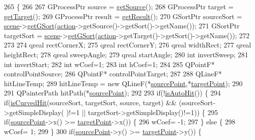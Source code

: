 \begin{DoxyCode}
265                                     \{
266 
267     GProcessPtr source = \hyperlink{classGAction_a4f4c104269fd0d40a61b22458db42dee}{getSource}();
268     GProcessPtr target = \hyperlink{classGAction_ac7aff6bc03be3791a8a20a914aae5b2c}{getTarget}();
269     GProcessPtr result = \hyperlink{classGAction_ae1ed003118c8333c6afa2e8d30e3dc07}{getResult}();
270     GSortPtr sourceSort = \hyperlink{classGAction_a5318deb6935859f5d2ebd1836ec6eb85}{scene}->\hyperlink{classPHScene_ae8be020b063c06f135d644937d65147b}{getGSort}(\hyperlink{classGAction_a22f734f6fb2fade298681819341b4f75}{action}->getSource()->getSort()->getName());
271     GSortPtr targetSort = \hyperlink{classGAction_a5318deb6935859f5d2ebd1836ec6eb85}{scene}->\hyperlink{classPHScene_ae8be020b063c06f135d644937d65147b}{getGSort}(\hyperlink{classGAction_a22f734f6fb2fade298681819341b4f75}{action}->getTarget()->getSort()->getName());
272 
273 
274     qreal rectCornerX;
275     qreal rectCornerY;
276     qreal widthRect;
277     qreal heightRect;
278     qreal sweepAngle;
279     qreal startAngle;
280     \textcolor{keywordtype}{int} invertSweep;
281     \textcolor{keywordtype}{int} invertStart;
282     \textcolor{keywordtype}{int} wCoef=1;
283     \textcolor{keywordtype}{int} hCoef=1;
284 
285     QPointF* controlPointSource;
286     QPointF* controlPointTarget;
287 
288     QLineF* hitLineTemp;
289     hitLineTemp = \textcolor{keyword}{new} QLineF(*\hyperlink{classGAction_adf67bcd561238d7626566cebeee2a151}{sourcePoint},*\hyperlink{classGAction_ad6992ac8b540932c370f5b46c48bbe70}{targetPoint});
290 
291     QPainterPath hitPath(*\hyperlink{classGAction_adf67bcd561238d7626566cebeee2a151}{sourcePoint});
292 
293     \textcolor{keywordflow}{if}(!\hyperlink{classGAction_aa03acf91fcd0c6b8eaa4fb5e610e83e5}{isAutoHit}()) \{
294         \textcolor{keywordflow}{if}(\hyperlink{classGAction_a92cac7175b3969a54197d401c13f5273}{isCurvedHit}(sourceSort, targetSort, source, target) && (sourceSort->getSimpleDisplay(
      )!=1 || targetSort->getSimpleDisplay()!=1)) \{
295             \textcolor{keywordflow}{if}(\hyperlink{classGAction_adf67bcd561238d7626566cebeee2a151}{sourcePoint}->x() >= \hyperlink{classGAction_ad6992ac8b540932c370f5b46c48bbe70}{targetPoint}->x()) \{
296                 wCoef= -1;
297             \} \textcolor{keywordflow}{else} \{
298                 wCoef= 1;
299             \}
300             \textcolor{keywordflow}{if}(\hyperlink{classGAction_adf67bcd561238d7626566cebeee2a151}{sourcePoint}->y() >= \hyperlink{classGAction_ad6992ac8b540932c370f5b46c48bbe70}{targetPoint}->y()) \{

\end{DoxyCode}
